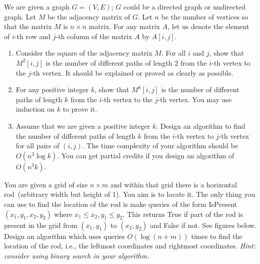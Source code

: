 \documentclass[11pt]{article}
\begin{document}
\begin{qunlist}
 We are given a graph $G = (V, E)$; $G$ could be a directed graph or undirected graph. Let $M$ be the adjacency matrix of $G$. Let $n$ be the number of vertices so that the matrix $M$ is $n \times n$ matrix. For any matrix $A$, let us denote the element of $i$-th row and $j$-th column of the matrix $A$ by $A[i, j]$.
\begin{enumerate}
    \item Consider the square of the adjacency matrix $M$. For all $i$ and $j$, show that $M^2[i, j]$ is the number of different paths of length $2$ from the $i$-th vertex to the $j$-th vertex. It should be explained or proved as clearly as possible.
    \item For any positive integer $k$, show that $M^k[i, j]$ is the number of different paths of length $k$  from the $i$-th vertex to the $j$-th vertex. You may use induction on $k$ to prove it.
    \item Assume that we are given a positive integer $k$. Design an algorithm to find the number of different paths of length $k$ from the $i$-th vertex to $j$-th vertex for all pairs of $(i,j)$. The time complexity of your algorithm should be $O(n^3 \log k)$. You can get partial credits if you design an algorithm of $O(n^3 k)$.
\end{enumerate}

You are given a grid of size $n\times m$ and within that grid there is a
horizontal rod~(arbitrary width but height of 1). You aim is to locate it. The only thing you can use to find the
location of the rod is make queries of the form IsPresent~$(x_1,y_1,x_2,y_2)$
where $x_1 \leq x_2 , y_1 \leq y_2$. This returns True if part of the rod is
present in the grid from $(x_1,y_1)$ to $(x_2,y_2)$ and False if not. See figures below.  Design
an algorithm which uses queries $O(\log(n + m))$ times to find the location of the rod, i.e., the leftmost coordinates and rightmost coordinates.
\emph{Hint: consider using binary search in your algorithm.}


\end{qunlist}
\end{document}
